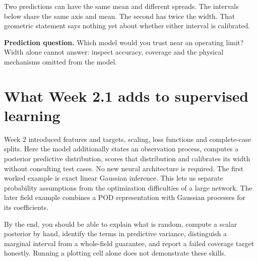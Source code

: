 \documentclass[11pt]{article}
\begin{document}
Two predictions can have the same mean and different spreads. The intervals
below share the same axis and mean. The second has twice the width. That geometric
statement says nothing yet about whether either interval is calibrated.
\begin{center}
\end{center}
\textbf{Prediction question.} Which model would you trust near an operating
limit? Width alone cannot answer: inspect accuracy, coverage and the physical
mechanisms omitted from the model.

\section{What Week 2.1 adds to supervised learning}
Week 2 introduced features and targets, scaling, loss functions and complete-case
splits. Here the model additionally states an observation process, computes a
posterior predictive distribution, scores that distribution and calibrates its
width without consulting test cases. No new neural architecture is required.
The first worked example is exact linear Gaussian inference. This lets us
separate probability assumptions from the optimization difficulties of a large
network. The later field example combines a POD representation with Gaussian
processes for its coefficients.

By the end, you should be able to explain what is random, compute a scalar
posterior by hand, identify the terms in predictive variance, distinguish a
marginal interval from a whole-field guarantee, and report a failed coverage
target honestly. Running a plotting cell alone does not demonstrate these skills.
\end{document}
